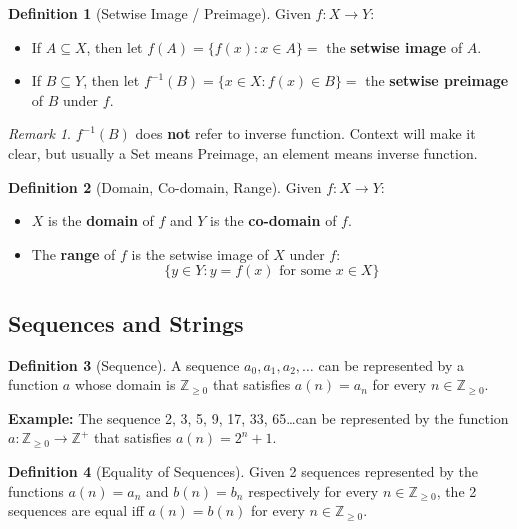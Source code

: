 \documentclass{article}
\theoremstyle{plain}
\theoremstyle{definition}
\newtheorem*{definition}{Definition}
\theoremstyle{remark}
\newtheorem*{remark}{Remark}
\begin{document}
\begin{definition}[Setwise Image / Preimage]
    Given $f: X \rightarrow Y$:
    \begin{itemize}
        \item If $A \subseteq X$, then let $f(A) = \{f(x) : x \in A\} =$ the \textbf{setwise image} of $A$.
        \item If $B \subseteq Y$, then let $f^{-1}(B) = \{x \in X : f(x) \in B\} =$ the \textbf{setwise preimage} of $B$ under $f$.
    \end{itemize}
\end{definition}
\begin{remark}
    $f^{-1}(B)$ does \textbf{not} refer to inverse function. Context will make it clear, but usually a Set means Preimage, an element means inverse function.
\end{remark}

\begin{definition}[Domain, Co-domain, Range]
    Given $f: X \rightarrow Y$:
    \begin{itemize}
        \item $X$ is the \textbf{domain} of $f$ and $Y$ is the \textbf{co-domain} of $f$.
        \item The \textbf{range} of $f$ is the setwise image of $X$ under $f$:
        \[ \{y \in Y : y = f(x) \text{ for some } x \in X\} \]
    \end{itemize}
\end{definition}

\subsection{Sequences and Strings}

\begin{definition}[Sequence]
    A sequence $a_0, a_1, a_2, \dots$ can be represented by a function $a$ whose domain is $\mathbb{Z}_{\geq 0}$ that satisfies $a(n) = a_n$ for every $n \in \mathbb{Z}_{\geq 0}$.
    
    \textbf{Example:} The sequence 2, 3, 5, 9, 17, 33, 65\dots can be represented by the function $a: \mathbb{Z}_{\geq 0} \rightarrow \mathbb{Z}^+$ that satisfies $a(n) = 2^n + 1$.
\end{definition}

\begin{definition}[Equality of Sequences]
    Given 2 sequences represented by the functions $a(n) = a_n$ and $b(n) = b_n$ respectively for every $n \in \mathbb{Z}_{\geq 0}$, the 2 sequences are equal iff $a(n) = b(n)$ for every $n \in \mathbb{Z}_{\geq 0}$.
\end{definition}
\end{document}
